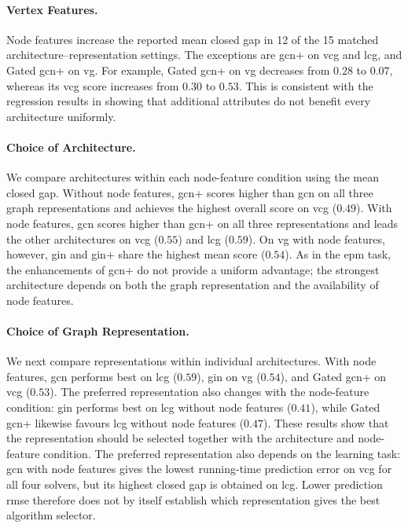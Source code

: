 \paragraph{Vertex Features.}
Node features increase the reported mean closed gap in 12 of the 15 matched architecture--representation settings. The exceptions are \gls{gcn}+ on \gls{vcg} and \gls{lcg}, and Gated \gls{gcn}+ on \gls{vg}. For example, Gated \gls{gcn}+ on \gls{vg} decreases from $0.28$ to $0.07$, whereas its \gls{vcg} score increases from $0.30$ to $0.53$. This is consistent with the regression results in showing that additional attributes do not benefit every architecture uniformly.

\paragraph{Choice of Architecture.}
We compare architectures within each node-feature condition using the mean closed gap. Without node features, \gls{gcn}+ scores higher than \gls{gcn} on all three graph representations and achieves the highest overall score on \gls{vcg} ($0.49$). With node features, \gls{gcn} scores higher than \gls{gcn}+ on all three representations and leads the other architectures on \gls{vcg} ($0.55$) and \gls{lcg} ($0.59$). On \gls{vg} with node features, however, \gls{gin} and \gls{gin}+ share the highest mean score ($0.54$). As in the \gls{epm} task, the enhancements of \gls{gcn}+ do not provide a uniform advantage; the strongest architecture depends on both the graph representation and the availability of node features.

\paragraph{Choice of Graph Representation.}
We next compare representations within individual architectures. With node features, \gls{gcn} performs best on \gls{lcg} ($0.59$), \gls{gin} on \gls{vg} ($0.54$), and Gated \gls{gcn}+ on \gls{vcg} ($0.53$). The preferred representation also changes with the node-feature condition: \gls{gin} performs best on \gls{lcg} without node features ($0.41$), while Gated \gls{gcn}+ likewise favours \gls{lcg} without node features ($0.47$). These results show that the representation should be selected together with the architecture and node-feature condition. The preferred representation also depends on the learning task: \gls{gcn} with node features gives the lowest running-time prediction error on \gls{vcg} for all four solvers, but its highest closed gap is obtained on \gls{lcg}. Lower prediction \gls{rmse} therefore does not by itself establish which representation gives the best algorithm selector.
\FloatBarrier

